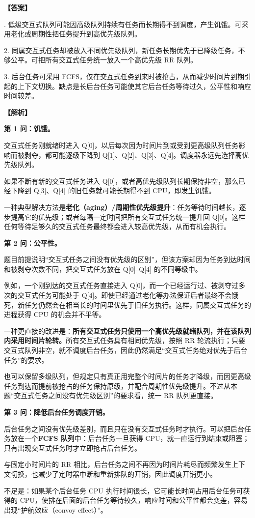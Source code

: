 \documentclass[UTF8,12pt]{ctexart}
\newenvironment{explanation}{\par\noindent\textbf{【解析】}\par\smallskip}{\par\medskip}
\newenvironment{answer}{\par\noindent\textbf{【答案】}\par\smallskip}{\par}
\begin{document}
\begin{answer}
1. 低级交互式队列可能因高级队列持续有任务而长期得不到调度，产生饥饿。可采用老化或周期性把任务提升到高优先级队列。

2. 同属交互式任务却被放入不同优先级队列，新任务长期优先于已降级任务，不够公平。可把所有交互式任务统一放入一个高优先级 RR 队列。

3. 后台任务可采用 FCFS，仅在交互式任务到来时被抢占，从而减少时间片到期引起的上下文切换。缺点是长后台任务可能使其它后台任务等待过久，公平性和响应时间较差。
\end{answer}

\begin{explanation}
\textbf{第 1 问：饥饿。}

交互式任务刚就绪时进入 Q[0]，以后每次因为时间片到或受到更高级队列任务影响而被剥夺，都可能逐级下降到 Q[1]、Q[2]、Q[3]、Q[4]。调度器永远先选择高优先级队列。

如果不断有新的交互式任务进入 Q[0]，或者高优先级队列长期保持非空，那么已经下降到 Q[3]、Q[4] 的旧任务就可能长期得不到 CPU，即发生饥饿。

一种典型解决方法是\textbf{老化（aging）/周期性优先级提升}：任务等待时间越长，逐步提高它的优先级；或者每隔一定时间把所有交互式任务统一提升回 Q[0]。这样任何等待足够久的交互式任务最终都会进入较高优先级，从而有机会执行。

\medskip
\textbf{第 2 问：公平性。}

题目前提说明“交互式任务之间没有优先级的区别”，但该方案却因为任务到达时间和被剥夺次数不同，把交互式任务放在 Q[0]--Q[4] 的不同等级中。

例如，一个刚到达的交互式任务直接进入 Q[0]，而一个已经运行过、被剥夺过多次的交互式任务可能处于 Q[4]。即使已经通过老化等办法保证后者最终不会饿死，新任务仍然会在相当长的时间里优先于旧任务执行。这样，同属交互式任务的进程获得 CPU 的机会并不平等。

一种更直接的改进是：\textbf{所有交互式任务只使用一个高优先级就绪队列，并在该队列内采用时间片轮转。}所有交互式任务具有相同优先级，按照 RR 轮流执行；只要交互式队列非空，就不调度后台任务，因此仍然满足“交互式任务绝对优先于后台任务”的要求。

也可以保留多级队列，但规定只有真正用完整个时间片的任务才降级，而因更高级任务到达而提前被抢占的任务保持原级，并配合周期性优先级提升。不过从本题“交互式任务之间没有优先级区别”的要求看，统一 RR 队列更直接。

\medskip
\textbf{第 3 问：降低后台任务调度开销。}

后台任务之间没有优先级差别，而且只在没有交互式任务时才执行。可以把后台任务放在一个\textbf{FCFS 队列}中：后台任务一旦获得 CPU，就一直运行到结束或阻塞；只有出现交互式任务时才立即抢占后台任务。

与固定小时间片的 RR 相比，后台任务之间不再因为时间片耗尽而频繁发生上下文切换，也减少了定时器中断和重新排队的开销，因此调度开销更小。

不足是：如果某个后台任务 CPU 执行时间很长，它可能长时间占用后台任务可获得的 CPU，使排在后面的后台任务等待较久，响应时间和公平性都会变差，容易出现“护航效应（convoy effect）”。
\end{explanation}
\end{document}
